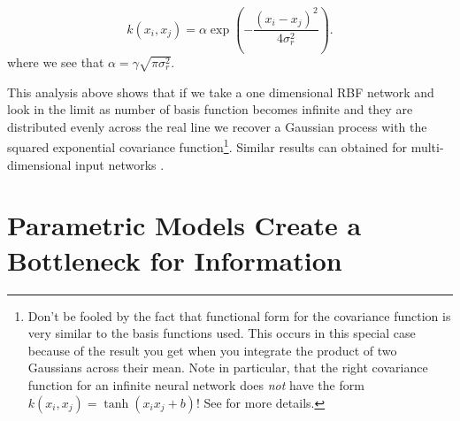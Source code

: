\[
k\left(x_i,x_j\right) = \alpha \exp\left(
  -\frac{\left(x_i-x_j\right)^2}{4\sigma_r^2}\right).
\]
where we see that $\alpha=\gamma \sqrt{\pi\sigma_r^2}$.

This analysis above shows that if we take a one dimensional RBF
network and look in the limit as number of basis function becomes
infinite and they are distributed evenly across the real line we
recover a Gaussian process with the squared exponential covariance
function\footnote{Don't be fooled by the fact that functional form for
  the covariance function is very similar to the basis functions
  used. This occurs in this special case because of the result you get
  when you integrate the product of two Gaussians across their
  mean. Note in particular, that the right covariance function for an
  infinite neural network does \emph{not} have the form
  $k\left(x_i,x_j\right) = \tanh\left(x_i x_j + b\right)$! See
  \cite{Williams:computation98} for more details.}. Similar results
can obtained for multi-dimensional input networks
\cite{Williams:computation98}.

\section{Parametric Models Create a Bottleneck for Information}

